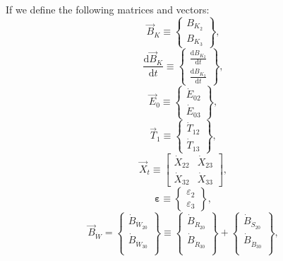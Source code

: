 %
If we define the following matrices and vectors:
%
\begin{equation} \label{eq:B_vec_def}
	\vec{B}_{K} 
	\equiv
	\begin{Bmatrix}	
		B_{K_{2}} \\
		B_{K_{3}}
	\end{Bmatrix},
\end{equation}
%
\begin{equation} \label{eq:dBdt_vec_def}
	\frac{\mathrm{d}\vec{B}_K}{\mathrm{d}t} 
	\equiv
	\begin{Bmatrix}	
		\frac{\mathrm{d}B_{K_{2}}}{\mathrm{d}t}	\\[0.4em] %
		\frac{\mathrm{d}B_{K_{3}}}{\mathrm{d}t}
	\end{Bmatrix},
\end{equation}
%
\begin{equation} \label{eq:E_vec_def}
	\vec{E}_{0} 
	\equiv
	\begin{Bmatrix}
		\dot{E}_{02} \\
		\dot{E}_{03}
	\end{Bmatrix},
\end{equation}
%
\begin{equation} \label{eq:T_vec_def}
	\vec{T}_{1} 
	\equiv
	\begin{Bmatrix}
		\dot{T}_{12} \\
		\dot{T}_{13}
	\end{Bmatrix},
\end{equation}
%
\begin{equation} \label{eq:X_t_matrix_def}
	\vec{X}_{t} 
	\equiv
	\begin{bmatrix}
		\dot{X}_{22} & \dot{X}_{23} \\
		\dot{X}_{32} & \dot{X}_{33}
	\end{bmatrix},
\end{equation}
%
\begin{equation} \label{eq:eps_vec_def}
	\boldsymbol{\varepsilon} 
	\equiv
	\begin{Bmatrix}
		\varepsilon_{2}	\\
		\varepsilon_{3}
	\end{Bmatrix},
\end{equation} 
%								
\begin{equation} \label{eq:waste_vec_def}
	\vec{B}_{\dot{W}} 
	=
	\begin{Bmatrix}
		\dot{B}_{\dot{W}_{20}}	\\
		\dot{B}_{\dot{W}_{30}}	\\
	\end{Bmatrix}
	\equiv
	\begin{Bmatrix}
		\dot{B}_{\dot{R}_{20}}	\\
		\dot{B}_{\dot{R}_{30}}	\\
	\end{Bmatrix}
	+
	\begin{Bmatrix}
		\dot{B}_{\dot{S}_{20}}	\\
		\dot{B}_{\dot{B}_{30}}	\\
	\end{Bmatrix},
\end{equation}
